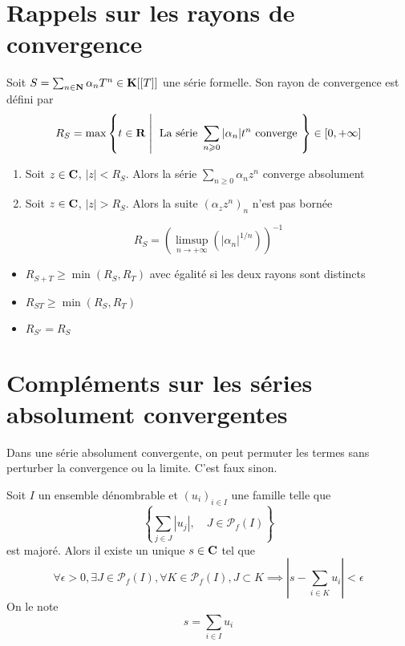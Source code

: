\section{Rappels sur les rayons de convergence}

\begin{dfn}
Soit $S=\sum_{n \in \mathbf N} \alpha_{n} T^{n} \in \mathbf K[[T]]$ une série formelle. Son rayon de convergence est défini par
\[
R_{S}=\max \left\{t \in \R \suchthat \text { La série } \sum_{n \geqslant 0} |\alpha_{n} |t^{n} \text { converge }\right\} \in[0,+\infty]
\]
\end{dfn}

\begin{prop}
\begin{enumerate}
    \item Soit $z \in  \mathbf C$, $|z|<R_S$. Alors la série  $\sum _{n\geq 0}\alpha_nz^n$ converge absolument
    \item Soit $z \in  \mathbf C$, $|z|>R_S$. Alors la suite $(\alpha_z z^n)_n$ n'est pas bornée
\end{enumerate}
\end{prop}

\begin{prop}
\[
R_S= \left(\limsup_{n\to +\infty}(|\alpha_n|^{1/n})\right)^{-1}
\]
\end{prop}

\begin{prop}
\begin{itemize}
    \item $R_{S+T}\geq \min(R_S, R_{T})$ avec égalité si les deux rayons sont distincts
    \item $R_{ST}\geq \min(R_S, R_{T})$
    \item $R_{S'}=R_S$
\end{itemize}
\end{prop}

\section{Compléments sur les séries absolument convergentes}

\begin{rem}
Dans une série absolument convergente, on peut permuter les termes sans perturber la convergence ou la limite. C'est faux sinon.\footnotemark
\end{rem}


\begin{prop}
    Soit $I$ un ensemble dénombrable et  $(u_i)_{i \in  I}$ une famille telle que \[
        \left\{ \sum_{j \in  J}|u_j| , \quad J \in \mathcal  P_f(I)\right\} 
    \] 
    est majoré. Alors il existe un unique $s \in  \mathbf C$ tel que \[
        \forall  \epsilon>0, \exists J \in \mathcal  P_f(I), \forall  K \in  \mathcal P_f(I), J\subset K \implies \left| s- \sum_{i \in  K} u_i \right|<\epsilon
    \] 
    On le note \[
    s=\sum_{i\in I} u_i
    \] 
\end{prop}

